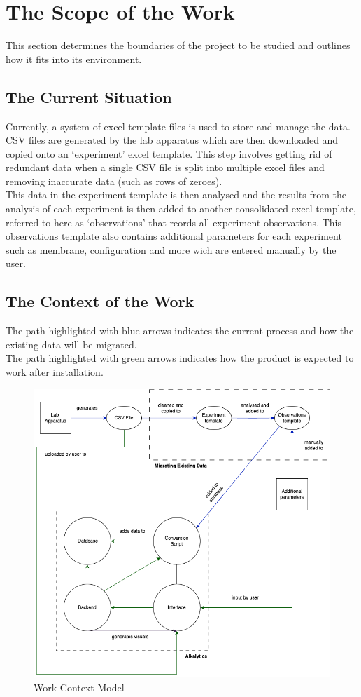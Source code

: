 \documentclass[12pt]{article}
\begin{document}
\section{The Scope of the Work}
This section determines the boundaries of the project to be studied and outlines how it fits into its environment.
\subsection{The Current Situation}
Currently, a system of excel template files is used to store and manage the data. CSV files are generated by the lab apparatus
which are then downloaded and copied onto an `experiment' excel template. This step involves getting rid of redundant data when a single CSV file is
split into multiple excel files and removing inaccurate data (such as rows of zeroes).\\
\newline
This data in the experiment template is then analysed and the results from the analysis of each experiment is then added to another consolidated excel template,
referred to here as `observations' that reords all experiment observations. This observations template also contains additional parameters for each experiment 
such as membrane, configuration and more wich are entered manually by the user.
\subsection{The Context of the Work}
The path highlighted with blue arrows indicates the current process and how the existing data will be migrated.\\
The path highlighted with green arrows indicates how the product is expected to work after installation.
\begin{figure}[H]
  \centering
  \includegraphics[scale=0.55]{Diagrams/Work Context Diagram.drawio.png}
  \caption{Work Context Model}
\end{figure}
\end{document}
